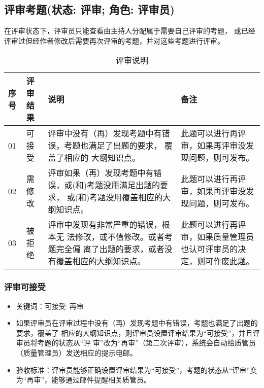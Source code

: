 \documentclass[hyperref, a4paper]{ctexart}
\providecommand{\tightlist}{%
  \setlength{\itemsep}{0pt}\setlength{\parskip}{0pt}}
\begin{document}
\hypertarget{ux8bc4ux5ba1ux8003ux9898ux72b6ux6001-ux8bc4ux5ba1-ux89d2ux8272-ux8bc4ux5ba1ux5458}{%
\subsection{评审考题(状态: 评审; 角色:
评审员)}\label{ux8bc4ux5ba1ux8003ux9898ux72b6ux6001-ux8bc4ux5ba1-ux89d2ux8272-ux8bc4ux5ba1ux5458}}

在评审状态下，评审员只能查看由主持人分配属于需要自己评审的考题，
或已经评审过但经作者修改后需要再次评审的考题，并对这些考题进行评审。

\begin{table}[!htbp]
  \caption{评审说明}
  \label{Tab:bookRWCal}
  \centering
  \begin{tabular}{|l|p{1.5cm}|p{5.3cm}|p{3.3cm}|}
  \hline
  \textbf{序号} &\textbf{评审结果} &\textbf{说明}&\textbf{备注}\\
  \hline
  01 & 可接受  & 评审中没有（再）发现考题中有错误，考题也满足了出题的要求，
  覆盖了相应的 大纲知识点。& 此题可以进行再评审，如果再评审没发现问题，则可发布。\\
  \hline
  02 & 需修改  & 评审如果（再）发现考题中有错误，或(和)考题没用满足出题的要求，
  或(和)考题没用覆盖相应的大纲知识点。& 此题可以进行再评审，如果再评审没发现问题，则可发布。\\
  \hline
  03  & 被拒绝 & 评审中发现有非常严重的错误，根本无 法修改，或不值修改。或者考题完全偏
  离了出题的要求，或者没有覆盖相应的大纲知识点。& 此题可以进行再评审，如果质量管理员也认可评审员的决定，则可作废此题。\\
  \hline
  \end{tabular}
\end{table}

\hypertarget{ux8bc4ux5ba1ux53efux63a5ux53d7}{%
\subsubsection{评审可接受}\label{ux8bc4ux5ba1ux53efux63a5ux53d7}}

\begin{itemize}
\tightlist
\item
  关键词：可接受~再审
\item
  如果评审员在评审过程中没有（再）发现考题中有错误，考题也满足了出题的要求，覆盖了
  相应的大纲知识点，则评审员设置评审结果为``可接受''，并且评审员将考题的状态从``评
  审''改为``再审''（第二次评审），系统会自动给质管员（质量管理员）发送相应的提示电邮。
\item
  验收标准：评审员能够正确设置评审结果为``可接受''，考题的状态从``评审''变为``再审''，能够通过邮件提醒相关质管员。
\end{itemize}
\end{document}
